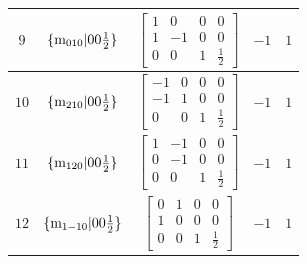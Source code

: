 \documentclass[fleqn,8pt]{jsarticle}
\begin{document}
\begin{longtable}{ccccc}
$ 9 $ & $ \{{\rm m}_{010}|0 0 \frac{1}{2}\} $ & $ \begin{bmatrix} 1 & 0 & 0 & 0 \\ 1 & -1 & 0 & 0 \\ 0 & 0 & 1 & \frac{1}{2} \end{bmatrix} $ & $ -1 $ & $ 1 $ \\ \hline
$ 10 $ & $ \{{\rm m}_{210}|0 0 \frac{1}{2}\} $ & $ \begin{bmatrix} -1 & 0 & 0 & 0 \\ -1 & 1 & 0 & 0 \\ 0 & 0 & 1 & \frac{1}{2} \end{bmatrix} $ & $ -1 $ & $ 1 $ \\ \hline
$ 11 $ & $ \{{\rm m}_{120}|0 0 \frac{1}{2}\} $ & $ \begin{bmatrix} 1 & -1 & 0 & 0 \\ 0 & -1 & 0 & 0 \\ 0 & 0 & 1 & \frac{1}{2} \end{bmatrix} $ & $ -1 $ & $ 1 $ \\ \hline
$ 12 $ & $ \{{\rm m}_{1-10}|0 0 \frac{1}{2}\} $ & $ \begin{bmatrix} 0 & 1 & 0 & 0 \\ 1 & 0 & 0 & 0 \\ 0 & 0 & 1 & \frac{1}{2} \end{bmatrix} $ & $ -1 $ & $ 1 $ \\
\end{longtable}
\end{document}
